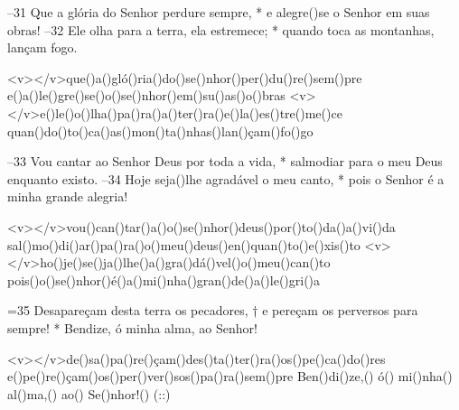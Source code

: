 –31 Que a glória do Senhor perdure sempre, *
e alegre()se o Senhor em suas obras!
–32 Ele olha para a terra, ela estremece; *
quando toca as montanhas, lançam fogo.

<v></v>que()a()gló()ria()do()se()nhor()per()du()re()sem()pre
e()a()le()gre()se()o()se()nhor()em()su()as()o()bras
<v></v>e()le()o()lha()pa()ra()a()ter()ra()e()la()es()tre()me()ce
quan()do()to()ca()as()mon()ta()nhas()lan()çam()fo()go

–33 Vou cantar ao Senhor Deus por toda a vida, *
salmodiar para o meu Deus enquanto existo.
–34 Hoje seja()lhe agradável o meu canto, *
pois o Senhor é a minha grande alegria!

<v></v>vou()can()tar()a()o()se()nhor()deus()por()to()da()a()vi()da
sal()mo()di()ar()pa()ra()o()meu()deus()en()quan()to()e()xis()to
<v></v>ho()je()se()ja()lhe()a()gra()dá()vel()o()meu()can()to
pois()o()se()nhor()é()a()mi()nha()gran()de()a()le()gri()a

=35 Desapareçam desta terra os pecadores, †
e pereçam os perversos para sempre! *
Bendize, ó minha alma, ao Senhor!

<v></v>de()sa()pa()re()çam()des()ta()ter()ra()os()pe()ca()do()res
e()pe()re()çam()os()per()ver()sos()pa()ra()sem()pre
Ben()di()ze,() ó() mi()nha() al()ma,() ao() Se()nhor!() (::)